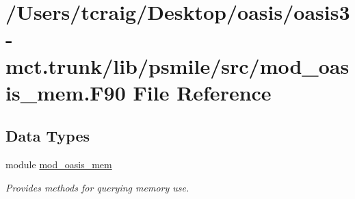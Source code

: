 \hypertarget{mod__oasis__mem_8_f90}{\section{/\+Users/tcraig/\+Desktop/oasis/oasis3-\/mct.trunk/lib/psmile/src/mod\+\_\+oasis\+\_\+mem.F90 File Reference}
\label{mod__oasis__mem_8_f90}
}
\subsection*{Data Types}
\begin{DoxyCompactItemize}
\item 
module \hyperlink{classmod__oasis__mem}{mod\+\_\+oasis\+\_\+mem}
\begin{DoxyCompactList}\small\item\em Provides methods for querying memory use. \end{DoxyCompactList}\end{DoxyCompactItemize}
